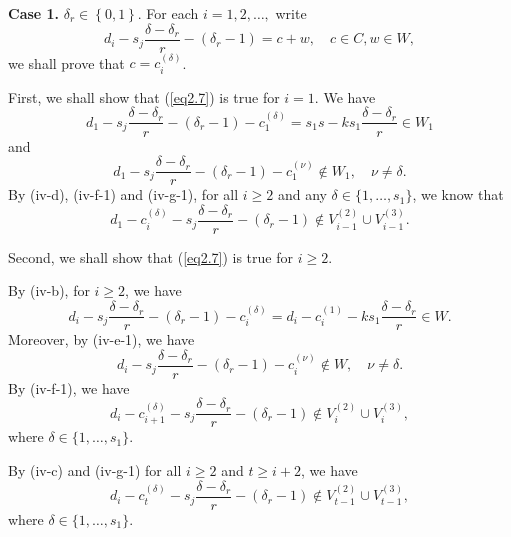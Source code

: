 \documentclass[12pt]{article}
\numberwithin{equation}{section}
\begin{document}
{\bf Case 1.} $ \delta_r\in \left\{0,1\right\}$. For each $i=1,2,\ldots,$ write
\begin{equation}\label{eq2.7}d_{i}-s_j\frac{\delta-\delta_r}{r}-(\delta_r-1)=c+w, \quad c\in C, w\in W,\end{equation}
 we shall prove that $c=c_i^{(\delta)}$.

First, we shall show that (\ref{eq2.7}) is true for $i=1$.
We have $$d_{1}-s_j\frac{\delta-\delta_r}{r}-(\delta_r-1)-c_1^{(\delta)}=s_1s-ks_1\frac{\delta-\delta_r}{r}\in W_{1}$$
and
$$d_{1}-s_j\frac{\delta-\delta_r}{r}-(\delta_r-1)-c_{1}^{(\nu)}\notin W_{1}, \quad \nu\neq \delta.$$
By (iv-d), (iv-f-1) and (iv-g-1), for all $i\geqslant 2$ and any $\delta\in\{1,\ldots,s_1\}$, we know that $$d_{1}-c_{i}^{(\delta)}-s_j\frac{\delta-\delta_r}{r}-(\delta_r-1)\notin V_{i-1}^{(2)}\cup V_{i-1}^{(3)}.$$

Second, we shall show that (\ref{eq2.7}) is true for $i\geqslant 2$.

By (iv-b), for $i\geq 2$, we have
\begin{equation}\label{eq2.8}d_{i}-s_j\frac{\delta-\delta_r}{r}-(\delta_r-1)-c_{i}^{(\delta)}=d_{i}-c_{i}^{(1)}-ks_1\frac{\delta-\delta_r}{r}\in W.\end{equation}
Moreover, by (iv-e-1), we have
\begin{equation}\label{eq2.9}d_{i}-s_j\frac{\delta-\delta_r}{r}-(\delta_r-1)-c_{i}^{(\nu)}\notin W, \quad \nu\neq \delta.\end{equation}
By (iv-f-1), we have
\begin{equation}\label{eq2.10}d_{i}-c_{i+1}^{(\delta)}-s_j\frac{\delta-\delta_r}{r}-(\delta_r-1)\notin V_{i}^{(2)}\cup V_{i}^{(3)},\end{equation}
where $\delta\in\{1,\ldots,s_1\}$.

By (iv-c) and (iv-g-1) for all $i\geqslant 2$ and $t\geqslant i+2$, we have
\begin{equation}\label{eq2.11}d_{i}-c_{t}^{(\delta)}-s_j\frac{\delta-\delta_r}{r}-(\delta_r-1)\notin V_{t-1}^{(2)}\cup V_{t-1}^{(3)},\end{equation}
where $\delta\in\{1,\ldots,s_1\}$.
\end{document}
